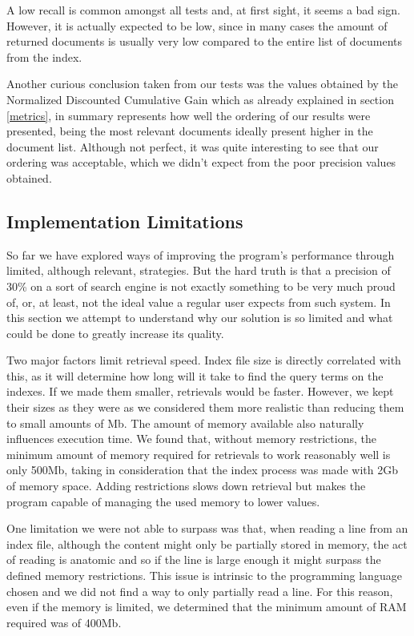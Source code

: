 \documentclass[12pt]{article}
\begin{document}
A low recall is common amongst all tests and, at first sight, it seems a bad sign.
However, it is actually expected to be low, since in many cases the amount of 
returned documents is usually very low compared to the entire list of documents 
from the index.

Another curious conclusion taken from our tests was the values obtained by the 
Normalized Discounted Cumulative Gain which as already explained in section 
\ref{metrics}, in summary represents how well the ordering of our results were 
presented, being the most relevant documents ideally present higher in the 
document list. 
Although not perfect, it was quite interesting to see that our ordering was 
acceptable, which we didn't expect from the poor precision values obtained.

\subsection{Implementation Limitations} \label{limitations}

So far we have explored ways of improving the program's performance through
limited, although relevant, strategies.
But the hard truth is that a precision of 30\% on a sort of search engine is not
exactly something to be very much proud of, or, at least, not the ideal value 
a regular user expects from such system.
In this section we attempt to understand why our solution is so limited and 
what could be done to greatly increase its quality.

Two major factors limit retrieval speed.
Index file size is directly correlated with this, as it will determine how long
will it take to find the query terms on the indexes. 
If we made them smaller, retrievals would be faster.
However, we kept their sizes as they were as we considered them more realistic 
than reducing them to small amounts of Mb.
The amount of memory available also naturally influences execution time.
We found that, without memory restrictions, the minimum amount of memory required 
for retrievals to work reasonably well is only 500Mb, taking in consideration 
that the index process was made with 2Gb of memory space.
Adding restrictions slows down retrieval but makes the program capable of managing
the used memory to lower values. 

One limitation we were not able to surpass was that, when reading a line from an 
index file, although the content might only be partially stored in memory, the act
of reading is anatomic and so if the line is large enough it might surpass the 
defined memory restrictions.
This issue is intrinsic to the programming language chosen and we did not find a 
way to only partially read a line.
For this reason, even if the memory is limited, we determined that the minimum 
amount of RAM required was of 400Mb.
\end{document}
